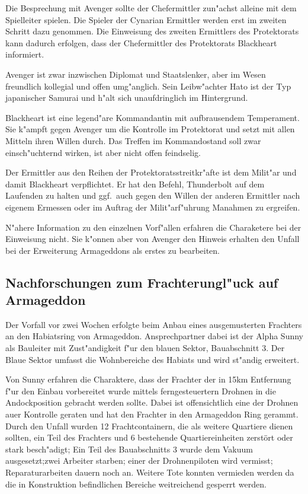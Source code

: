 \begin{remarks}
	Die Besprechung mit Avenger sollte der Chefermittler zun"achst alleine mit dem Spielleiter spielen. Die Spieler der Cynarian Ermittler werden erst im zweiten Schritt dazu genommen. Die Einweisung des zweiten Ermittlers des Protektorats kann dadurch erfolgen, dass der Chefermittler des Protektorats Blackheart informiert.
	
	Avenger ist zwar inzwischen Diplomat und Staatslenker, aber im Wesen freundlich kollegial und offen umg"anglich. Sein Leibw"achter Hato ist der Typ japanischer Samurai und h"alt sich unaufdringlich im Hintergrund.
	
	Blackheart ist eine legend"are Kommandantin mit aufbrausendem Temperament. Sie k"ampft gegen Avenger um die Kontrolle im Protektorat und setzt mit allen Mitteln ihren Willen durch. Das Treffen im Kommandostand soll zwar einsch"uchternd wirken, ist aber nicht offen feindselig.
	
	Der Ermittler aus den Reihen der Protektoratsstreitkr"afte ist dem Milit"ar und damit Blackheart verpflichtet. Er hat den Befehl, Thunderbolt auf dem Laufenden zu halten und ggf.~auch gegen den Willen der anderen Ermittler nach eigenem Ermessen oder im Auftrag der Milit"arf"uhrung Ma\3nahmen zu ergreifen.
	
	N"ahere Information zu den einzelnen Vorf"allen erfahren die Charaketere bei der Einweisung nicht. Sie k"onnen aber von Avenger den Hinweis erhalten den Unfall bei der Erweiterung Armageddons als erstes zu bearbeiten.
\end{remarks}

\subsection{Nachforschungen zum Frachterungl"uck auf Armageddon}

Der Vorfall vor zwei Wochen erfolgte beim Anbau eines ausgemusterten Frachters an den Habiatsring von Armageddon. Ansprechpartner dabei ist der Alpha Sunny als Bauleiter mit Zust"andigkeit f"ur den blauen Sektor, Bauabschnitt 3. Der Blaue Sektor umfasst die Wohnbereiche des Habiats und wird st"andig erweitert.

Von Sunny erfahren die Charaktere, dass der Frachter der in 15km Entfernung f"ur den Einbau vorbereitet wurde mittels ferngesteuertern Drohnen in die Andockposition gebracht werden sollte. Dabei ist offensichtlich eine der Drohnen au\3er Kontrolle geraten und hat den Frachter in den Armageddon Ring gerammt. Durch den Unfall wurden 12 Frachtcontainern, die als weitere Quartiere dienen sollten, ein Teil des Frachters und 6 bestehende Quartiereinheiten zerstört oder stark besch"adigt; Ein Teil des Bauabschnitts 3 wurde dem Vakuum ausgesetzt;zwei Arbeiter starben; einer der Drohnenpiloten wird vermisst; Reparaturarbeiten dauern noch an. Weitere Tote konnten vermieden werden da die in Konstruktion befindlichen Bereiche weitreichend gesperrt werden.

